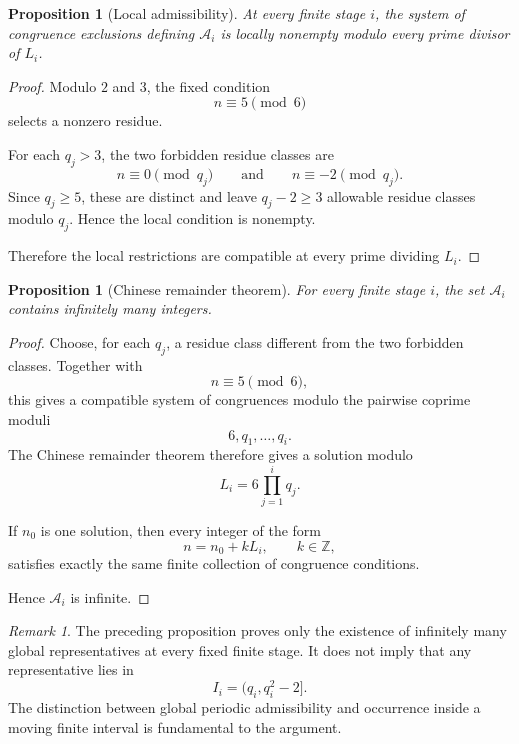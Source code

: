\documentclass[11pt,a4paper]{article}
\newtheorem{proposition}[theorem]{Proposition}
\theoremstyle{definition}
\theoremstyle{remark}
\newtheorem{remark}[theorem]{Remark}
\newcommand{\ZZ}{\mathbb{Z}}
\newcommand{\Acal}{\mathcal{A}}
\begin{document}
\begin{proposition}[Local admissibility]
At every finite stage $i$, the system of congruence exclusions defining
$\Acal_i$ is locally nonempty modulo every prime divisor of $L_i$.
\end{proposition}

\begin{proof}
Modulo $2$ and $3$, the fixed condition
\[
    n\equiv5\pmod6
\]
selects a nonzero residue.

For each $q_j>3$, the two forbidden residue classes are
\[
    n\equiv0\pmod{q_j}
    \qquad\text{and}\qquad
    n\equiv-2\pmod{q_j}.
\]
Since $q_j\ge5$, these are distinct and leave
$q_j-2\ge3$ allowable residue classes modulo $q_j$.
Hence the local condition is nonempty.



Therefore the local restrictions are compatible at every prime
dividing $L_i$.
\end{proof}

\begin{proposition}[Chinese remainder theorem]
For every finite stage $i$, the set $\Acal_i$ contains infinitely many
integers.
\end{proposition}

\begin{proof}
Choose, for each $q_j$, a residue class different from the two forbidden
classes.  Together with
\[
    n\equiv5\pmod6,
\]
this gives a compatible system of congruences modulo the pairwise
coprime moduli
\[
    6,q_1,\ldots,q_{i}.
\]
The Chinese remainder theorem therefore gives a solution modulo
\[
    L_i=6\prod_{j=1}^{i}q_j.
\]

If $n_0$ is one solution, then every integer of the form
\[
    n=n_0+kL_i,\qquad k\in\ZZ,
\]
satisfies exactly the same finite collection of congruence conditions.

Hence $\Acal_i$ is infinite.
\end{proof}

\begin{remark}
The preceding proposition proves only the existence of infinitely many
global representatives at every fixed finite stage.  It does not imply
that any representative lies in
\[
    I_i=(q_i,q_i^2-2].
\]
The distinction between global periodic admissibility and occurrence
inside a moving finite interval is fundamental to the argument.
\end{remark}

\end{document}
